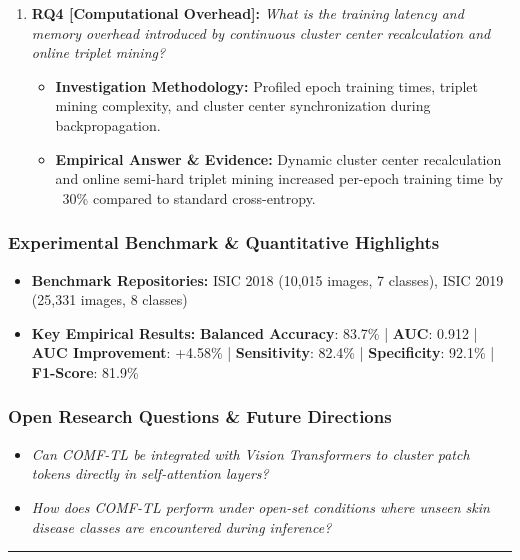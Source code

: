 \begin{enumerate}[label=\textbf{\arabic*.}, leftmargin=*]
\begin{itemize}[leftmargin=1.5em]
    \item \textbf{Empirical Answer \& Evidence:} Demonstrated strong scalability, achieving an overall AUC of 0.912 and an F1-score of 81.9\% on ISIC 2019, consistently outperforming standard cross-entropy baselines.
  \end{itemize}
  \item \textbf{RQ4 [Computational Overhead]:} \textit{What is the training latency and memory overhead introduced by continuous cluster center recalculation and online triplet mining?}
  \begin{itemize}[leftmargin=1.5em]
    \item \textbf{Investigation Methodology:} Profiled epoch training times, triplet mining complexity, and cluster center synchronization during backpropagation.
    \item \textbf{Empirical Answer \& Evidence:} Dynamic cluster center recalculation and online semi-hard triplet mining increased per-epoch training time by ~30\% compared to standard cross-entropy.
  \end{itemize}
\end{enumerate}

\subsubsection*{Experimental Benchmark \& Quantitative Highlights}
\begin{itemize}[leftmargin=*]
  \item \textbf{Benchmark Repositories:} ISIC 2018 (10,015 images, 7 classes), ISIC 2019 (25,331 images, 8 classes)
  \item \textbf{Key Empirical Results:} \textbf{Balanced Accuracy}: 83.7\% \quad | \quad \textbf{AUC}: 0.912 \quad | \quad \textbf{AUC Improvement}: +4.58\% \quad | \quad \textbf{Sensitivity}: 82.4\% \quad | \quad \textbf{Specificity}: 92.1\% \quad | \quad \textbf{F1-Score}: 81.9\%
\end{itemize}

\subsubsection*{Open Research Questions \& Future Directions}
\begin{itemize}[leftmargin=*]
  \item \textit{Can COMF-TL be integrated with Vision Transformers to cluster patch tokens directly in self-attention layers?}
  \item \textit{How does COMF-TL perform under open-set conditions where unseen skin disease classes are encountered during inference?}
\end{itemize}
\vspace{0.8em}\hrule\vspace{1.2em}
